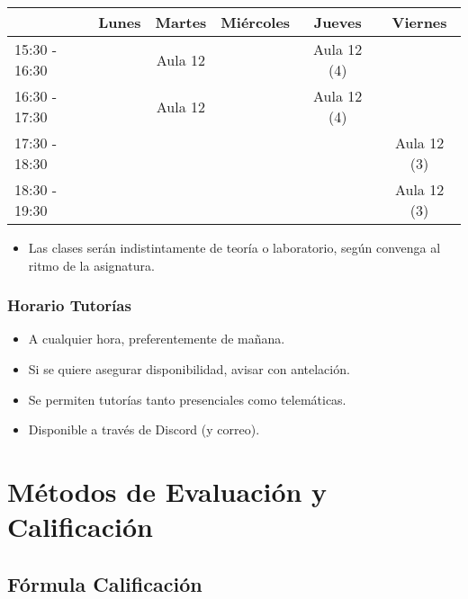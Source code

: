 \documentclass[handout,a4paper,t,xcolor=pst,colortheme]{beamer}
\begin{document}
\begin{frame}[c]
\begin{small}
{\begin{center}
				\begin{tabular}{||l|c|c|c|c|c||}
					\hline \hline
					& Lunes & Martes  & Miércoles & Jueves      & Viernes     \\ \hline \hline
					15:30 - 16:30  &       & Aula 12 &           & Aula 12 (4) &             \\ \hline
					16:30 - 17:30  &       & Aula 12 &           & Aula 12 (4) &             \\ \hline
					17:30 - 18:30  &       &         &           &             & Aula 12 (3) \\ \hline
					18:30 - 19:30  &       &         &           &             & Aula 12 (3) \\ \hline
					\hline
				\end{tabular}
			\end{center}
		}
	\end{small}
	\begin{itemize}
		\item<3-> Las clases serán indistintamente de teoría o laboratorio, según convenga al ritmo de la asignatura.
	\end{itemize}
\end{frame}

\begin{frame}[c]
	\frametitle{Horario Tutorías}
	\begin{itemize}[<+->]
		\item A cualquier hora, preferentemente de mañana.
		\item Si se quiere asegurar disponibilidad, avisar con antelación.
		\item Se permiten tutorías tanto presenciales como telemáticas.
		\item Disponible a través de Discord (y correo).
	\end{itemize}
\end{frame}

\section{Métodos de Evaluación y Calificación}

\subsection{Fórmula Calificación}
\end{document}
